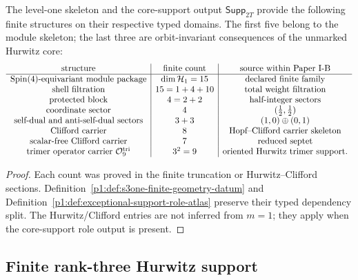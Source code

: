 \documentclass[11pt]{article}
\begin{document}
\begin{corollary}[\(m=1\) finite carrier atlas]
\label{p1:cor:s3one-finite-carrier-atlas}
The level-one skeleton and the core-support output
\(\mathsf{Supp}_{2T}\) provide the following finite structures on their
respective typed domains.  The first five belong to the module skeleton; the
last three are orbit-invariant consequences of the unmarked Hurwitz core:
\[
\begin{array}{c|c|c}
\text{structure} & \text{finite count} & \text{source within Paper I-B}\\
\hline
\operatorname{Spin}(4)\text{-equivariant module package} & \dim\mathcal H_1=15 & \text{declared finite family}\\
\text{shell filtration} & 15=1+4+10 & \text{total weight filtration}\\
\text{protected block} & 4=2+2 & \text{half-integer sectors}\\
\text{coordinate sector} & 4 & (\tfrac12,\tfrac12)\\
\text{self-dual and anti-self-dual sectors} & 3+3 & (1,0)\oplus(0,1)\\
\text{Clifford carrier} & 8 & \text{Hopf--Clifford carrier skeleton}\\
\text{scalar-free Clifford carrier} & 7 & \text{reduced septet}\\
\text{trimer operator carrier }\mathcal O_9^{\rm tri} & 3^2=9 & \text{oriented Hurwitz trimer support}.
\end{array}
\]
\end{corollary}

\begin{proof}
Each count was proved in the finite truncation or Hurwitz--Clifford sections.
Definition~\ref{p1:def:s3one-finite-geometry-datum} and
Definition~\ref{p1:def:exceptional-support-role-atlas} preserve their typed
dependency split.  The Hurwitz/Clifford entries are not inferred from
\(m=1\); they apply when the core-support role output is present.
\end{proof}

\subsection{Finite rank-three Hurwitz support}
\end{document}
